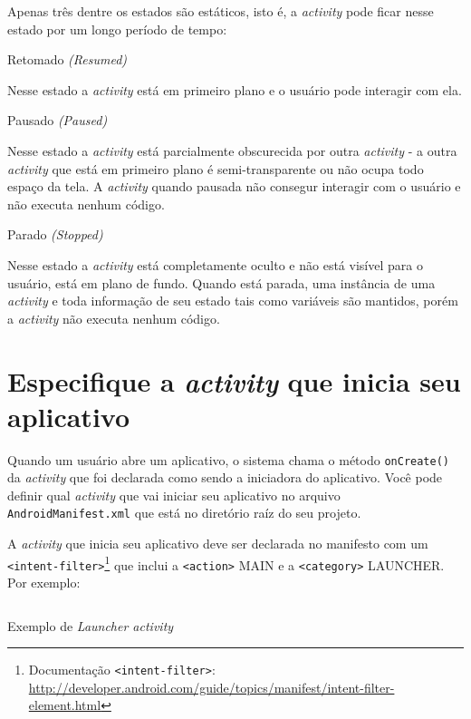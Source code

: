\documentclass[a4paper,12pt,brazil]{book}
\begin{document}
\begin{singlespace}
Apenas três dentre os estados são estáticos, isto é, a \emph{activity} pode ficar nesse estado por um longo período de tempo:


Retomado \emph{(Resumed)}
	
\hspace*{5mm} Nesse estado a \emph{activity} está em primeiro plano e o usuário pode interagir com ela.
	
Pausado \emph{(Paused)}
	
\hspace*{5mm} Nesse estado a \emph{activity} está parcialmente obscurecida por outra \emph{activity} - a outra \emph{activity} que está em primeiro plano é semi-transparente ou não ocupa todo espaço da tela. A \emph{activity} quando pausada não consegur interagir com o usuário e não executa nenhum código.
	
Parado \emph{(Stopped)}
	
\hspace*{5mm} Nesse estado a \emph{activity} está completamente oculto e não está visível para o usuário, está em plano de fundo. Quando está parada, uma instância de uma \emph{activity} e toda informação de seu estado tais como variáveis são mantidos, porém a \emph{activity} não executa nenhum código.
	
\section{Especifique a \emph{activity} que inicia seu aplicativo}
\label{sec:especact}

Quando um usuário abre um aplicativo, o sistema chama o método \texttt{onCreate()} da \emph{activity} que foi declarada como sendo a iniciadora do aplicativo. Você pode definir qual \emph{activity} que vai iniciar seu aplicativo no arquivo \texttt{AndroidManifest.xml} que está no diretório raíz do seu projeto.

 A \emph{activity} que inicia seu aplicativo deve ser declarada no manifesto com um \texttt{<intent-filter>}\footnote{Documentação \texttt{<intent-filter>}: \href{http://developer.android.com/guide/topics/manifest/intent-filter-element.html}{http://developer.android.com/guide/topics/manifest/intent-filter-element.html}} que inclui a \texttt{<action>} MAIN e a \texttt{<category>} LAUNCHER. Por exemplo:
 
\begin{listing}[H]
\inputminted[linenos=true,fontsize=\small,frame=lines, framesep=2mm, tabsize=2,numbersep=5pt]{xml}{src/design/launcher-manifest.xml}
\caption{Exemplo de \emph{Launcher activity}}
\end{listing}


\end{singlespace}
\end{document}
